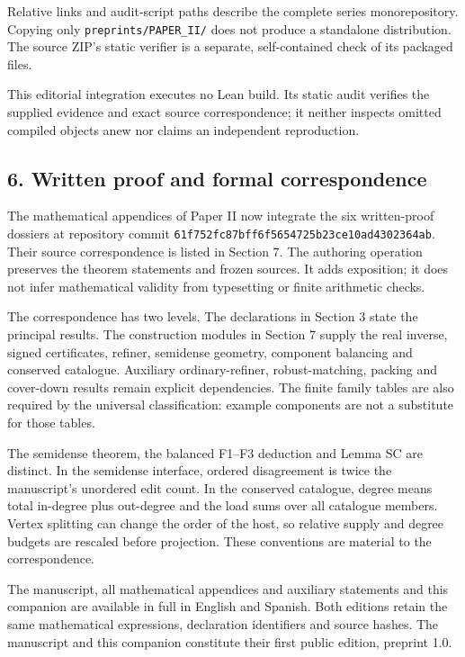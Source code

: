 \documentclass[english,11pt,a4paper]{article}
\begin{document}
Relative links and audit-script paths describe the complete series monorepository. Copying only \texttt{preprints/\allowbreak{}PA\allowbreak{}PER\_\allowbreak{}II/\allowbreak{}} does not produce a standalone distribution. The source ZIP's static verifier is a separate, self-contained check of its packaged files.

This editorial integration executes no Lean build. Its static audit verifies the supplied evidence and exact source correspondence; it neither inspects omitted compiled objects anew nor claims an independent reproduction.

\subsection{6. Written proof and formal correspondence}\label{written-proof-and-formal-correspondence}

The mathematical appendices of Paper II now integrate the six written-proof dossiers at repository commit \texttt{61f752fc\allowbreak{}87bf\allowbreak{}f6f5\allowbreak{}654725b2\allowbreak{}\allowbreak{}3ce10ad4\allowbreak{}3023\allowbreak{}64ab\allowbreak{}}. Their source correspondence is listed in Section 7. The authoring operation preserves the theorem statements and frozen sources. It adds exposition; it does not infer mathematical validity from typesetting or finite arithmetic checks.

The correspondence has two levels. The declarations in Section 3 state the principal results. The construction modules in Section 7 supply the real inverse, signed certificates, refiner, semidense geometry, component balancing and conserved catalogue. Auxiliary ordinary-refiner, robust-matching, packing and cover-down results remain explicit dependencies. The finite family tables are also required by the universal classification: example components are not a substitute for those tables.

The semidense theorem, the balanced F1--F3 deduction and Lemma SC are distinct. In the semidense interface, ordered disagreement is twice the manuscript's unordered edit count. In the conserved catalogue, degree means total in-degree plus out-degree and the load sums over all catalogue members. Vertex splitting can change the order of the host, so relative supply and degree budgets are rescaled before projection. These conventions are material to the correspondence.

The manuscript, all mathematical appendices and auxiliary statements and this companion are available in full in English and Spanish. Both editions retain the same mathematical expressions, declaration identifiers and source hashes. The manuscript and this companion constitute their first public edition, preprint 1.0.
\end{document}
